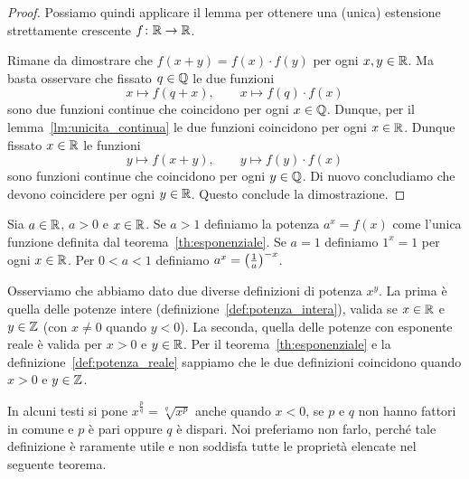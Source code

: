 \begin{proof}
Possiamo quindi applicare il lemma
per ottenere una (unica) estensione
strettamente crescente $f\colon \mathbb R\to\mathbb R$.

Rimane da dimostrare che $f(x+y)=f(x)\cdot f(y)$
per ogni $x,y\in \mathbb R$. Ma basta osservare che
fissato $q\in \mathbb Q$ le due funzioni
\[
  x \mapsto f(q+x), \qquad x \mapsto f(q)\cdot f(x)
\]
sono due funzioni continue che coincidono
per ogni $x\in \mathbb Q$.
Dunque, per il lemma~\ref{lm:unicita_continua}
le due funzioni coincidono per ogni $x\in \mathbb R$.
Dunque fissato $x\in \mathbb R$ le funzioni
\[
 y\mapsto f(x+y), \qquad y \mapsto f(y)\cdot f(x)
\]
sono funzioni continue che coincidono per
ogni $y\in \mathbb Q$. Di nuovo concludiamo che
devono coincidere per ogni $y\in \mathbb R$.
Questo conclude la dimostrazione.
\end{proof}

\begin{definition}
\label{def:potenza_reale}%
%
Sia $a\in \mathbb R$, $a>0$ e $x\in \mathbb R$.
Se $a>1$ definiamo la potenza $a^x = f(x)$ come
l'unica funzione definita dal teorema~\ref{th:esponenziale}.
Se $a=1$ definiamo $1^x=1$ per ogni $x\in \mathbb R$.
Per $0<a<1$ definiamo
$a^x = {\left( \frac{1}{a} \right)}^{-x}$.
\end{definition}

Osserviamo che abbiamo dato due diverse definizioni di potenza
$x^y$.
La prima è quella delle potenze intere (definizione~\ref{def:potenza_intera}),
valida se $x\in \mathbb R$ e $y\in \mathbb Z$
(con $x\neq 0$ quando $y<0$).
La seconda, quella delle potenze con esponente
reale è valida per $x>0$ e $y\in \mathbb R$.
Per il teorema~\ref{th:esponenziale} e la
definizione~\ref{def:potenza_reale}
sappiamo che le due definizioni coincidono quando
$x>0$ e $y\in \mathbb Z$.

In alcuni testi si pone $x^{\frac pq}=\sqrt[q]{x^p}$
anche quando $x<0$, se $p$ e $q$ non hanno fattori in comune
e $p$ è pari oppure $q$ è dispari.
Noi preferiamo non farlo, perché tale definizione
è raramente utile e non soddisfa tutte le proprietà
elencate nel seguente teorema.

